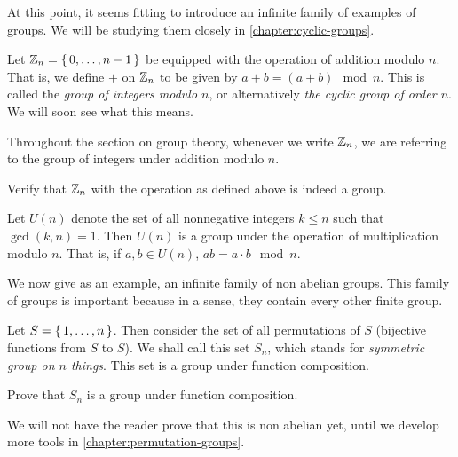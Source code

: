 \documentclass[./main.tex]{subfiles}
\begin{document}
At this point, it seems fitting to introduce an infinite family of examples of
groups. We will be studying them closely in \cref{chapter:cyclic-groups}. 
\begin{example}
    Let $\mathbb{Z}_n = \set{0, \dots, n-1}$ be equipped with the operation of addition
    modulo $n$. That is, we define $+$ on $\mathbb{Z}_n$ to be given by $a + b = (a +
    b) \mod n$. This is called the \emph{group of integers modulo $n$}, or
    alternatively \emph{the cyclic group of order $n$}. We will soon see what
    this means.
\end{example}
Throughout the section on group theory, whenever we write $\mathbb{Z}_n$, we are
referring to the group of integers under addition modulo $n$. 

\begin{exercise}
    Verify that $\mathbb{Z}_n$ with the operation as defined above is indeed a group.
\end{exercise}

\begin{example}
    Let $U(n)$ denote the set of all nonnegative integers $k \leq n$ such that
    $\gcd(k, n) = 1$. Then $U(n)$ is a group under the operation of
    multiplication modulo $n$. That is, if $a, b \in U(n)$, $ab = a \cdot b \mod
    n$.
\end{example}

We now give as an example, an infinite family of non abelian groups. This family
of groups is important because in a sense, they contain every other finite
group. 
\begin{example}
\label{example:symmetric-groups}
    Let $S = \set{1, \dots, n}$. Then consider the set of all permutations of
    $S$ (bijective functions from $S$ to $S$). We shall call this set $S_n$,
    which stands for \emph{symmetric group on $n$ things}. This set is a group
    under function composition.
\end{example}
\begin{exercise}
    Prove that $S_n$ is a group under function composition.
\end{exercise}
We will not have the reader prove that this is non abelian yet, until we develop
more tools in \cref{chapter:permutation-groups}.
\end{document}
